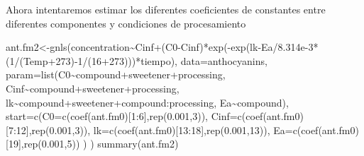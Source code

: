 \documentclass[
]{article}
\newenvironment{Shaded}{\begin{snugshade}}{\end{snugshade}}
\newcommand{\AttributeTok}[1]{\textcolor[rgb]{0.77,0.63,0.00}{#1}}
\newcommand{\DecValTok}[1]{\textcolor[rgb]{0.00,0.00,0.81}{#1}}
\newcommand{\FloatTok}[1]{\textcolor[rgb]{0.00,0.00,0.81}{#1}}
\newcommand{\FunctionTok}[1]{\textcolor[rgb]{0.00,0.00,0.00}{#1}}
\newcommand{\NormalTok}[1]{#1}
\newcommand{\OtherTok}[1]{\textcolor[rgb]{0.56,0.35,0.01}{#1}}
\newcommand{\SpecialCharTok}[1]{\textcolor[rgb]{0.00,0.00,0.00}{#1}}
\begin{document}
Ahora intentaremos estimar los diferentes coeficientes de constantes
entre diferentes componentes y condiciones de procesamiento

\begin{Shaded}
\begin{Highlighting}[]
\NormalTok{ant.fm2}\OtherTok{\textless{}{-}}\FunctionTok{gnls}\NormalTok{(concentration}\SpecialCharTok{\textasciitilde{}}\NormalTok{Cinf}\SpecialCharTok{+}\NormalTok{(C0}\SpecialCharTok{{-}}\NormalTok{Cinf)}\SpecialCharTok{*}\FunctionTok{exp}\NormalTok{(}\SpecialCharTok{{-}}\FunctionTok{exp}\NormalTok{(lk}\SpecialCharTok{{-}}\NormalTok{Ea}\SpecialCharTok{/}\FloatTok{8.314e{-}3}\SpecialCharTok{*}\NormalTok{(}\DecValTok{1}\SpecialCharTok{/}\NormalTok{(Temp}\SpecialCharTok{+}\DecValTok{273}\NormalTok{)}\SpecialCharTok{{-}}\DecValTok{1}\SpecialCharTok{/}\NormalTok{(}\DecValTok{16}\SpecialCharTok{+}\DecValTok{273}\NormalTok{)))}\SpecialCharTok{*}\NormalTok{tiempo),}
               \AttributeTok{data=}\NormalTok{anthocyanins,}
               \AttributeTok{param=}\FunctionTok{list}\NormalTok{(C0}\SpecialCharTok{\textasciitilde{}}\NormalTok{compound}\SpecialCharTok{+}\NormalTok{sweetener}\SpecialCharTok{+}\NormalTok{processing,}
\NormalTok{                          Cinf}\SpecialCharTok{\textasciitilde{}}\NormalTok{compound}\SpecialCharTok{+}\NormalTok{sweetener}\SpecialCharTok{+}\NormalTok{processing,}
\NormalTok{                          lk}\SpecialCharTok{\textasciitilde{}}\NormalTok{compound}\SpecialCharTok{+}\NormalTok{sweetener}\SpecialCharTok{+}\NormalTok{compound}\SpecialCharTok{:}\NormalTok{processing,}
\NormalTok{                          Ea}\SpecialCharTok{\textasciitilde{}}\NormalTok{compound),}
               \AttributeTok{start=}\FunctionTok{c}\NormalTok{(}\AttributeTok{C0=}\FunctionTok{c}\NormalTok{(}\FunctionTok{coef}\NormalTok{(ant.fm0)[}\DecValTok{1}\SpecialCharTok{:}\DecValTok{6}\NormalTok{],}\FunctionTok{rep}\NormalTok{(}\FloatTok{0.001}\NormalTok{,}\DecValTok{3}\NormalTok{)),}
                       \AttributeTok{Cinf=}\FunctionTok{c}\NormalTok{(}\FunctionTok{coef}\NormalTok{(ant.fm0)[}\DecValTok{7}\SpecialCharTok{:}\DecValTok{12}\NormalTok{],}\FunctionTok{rep}\NormalTok{(}\FloatTok{0.001}\NormalTok{,}\DecValTok{3}\NormalTok{)),}
                       \AttributeTok{lk=}\FunctionTok{c}\NormalTok{(}\FunctionTok{coef}\NormalTok{(ant.fm0)[}\DecValTok{13}\SpecialCharTok{:}\DecValTok{18}\NormalTok{],}\FunctionTok{rep}\NormalTok{(}\FloatTok{0.001}\NormalTok{,}\DecValTok{13}\NormalTok{)),}
                       \AttributeTok{Ea=}\FunctionTok{c}\NormalTok{(}\FunctionTok{coef}\NormalTok{(ant.fm0)[}\DecValTok{19}\NormalTok{],}\FunctionTok{rep}\NormalTok{(}\FloatTok{0.001}\NormalTok{,}\DecValTok{5}\NormalTok{))}
\NormalTok{               )}
\NormalTok{)}
\FunctionTok{summary}\NormalTok{(ant.fm2)}
\end{Highlighting}
\end{Shaded}
\end{document}
